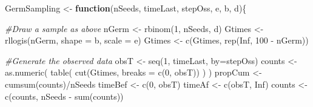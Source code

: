 \documentclass[
]{book}
\newenvironment{Shaded}{\begin{snugshade}}{\end{snugshade}}
\newcommand{\AttributeTok}[1]{\textcolor[rgb]{0.77,0.63,0.00}{#1}}
\newcommand{\CommentTok}[1]{\textcolor[rgb]{0.56,0.35,0.01}{\textit{#1}}}
\newcommand{\ConstantTok}[1]{\textcolor[rgb]{0.00,0.00,0.00}{#1}}
\newcommand{\ControlFlowTok}[1]{\textcolor[rgb]{0.13,0.29,0.53}{\textbf{#1}}}
\newcommand{\DecValTok}[1]{\textcolor[rgb]{0.00,0.00,0.81}{#1}}
\newcommand{\FunctionTok}[1]{\textcolor[rgb]{0.00,0.00,0.00}{#1}}
\newcommand{\NormalTok}[1]{#1}
\newcommand{\OtherTok}[1]{\textcolor[rgb]{0.56,0.35,0.01}{#1}}
\newcommand{\SpecialCharTok}[1]{\textcolor[rgb]{0.00,0.00,0.00}{#1}}
\begin{document}
\begin{Shaded}
\begin{Highlighting}[]
\NormalTok{GermSampling }\OtherTok{\textless{}{-}} \ControlFlowTok{function}\NormalTok{(nSeeds, timeLast, stepOss, e, b, d)\{}
    
    \CommentTok{\#Draw a sample as above}
\NormalTok{    nGerm }\OtherTok{\textless{}{-}} \FunctionTok{rbinom}\NormalTok{(}\DecValTok{1}\NormalTok{, nSeeds, d)}
\NormalTok{    Gtimes }\OtherTok{\textless{}{-}} \FunctionTok{rllogis}\NormalTok{(nGerm, }\AttributeTok{shape =}\NormalTok{ b, }\AttributeTok{scale =}\NormalTok{ e)}
\NormalTok{    Gtimes }\OtherTok{\textless{}{-}} \FunctionTok{c}\NormalTok{(Gtimes, }\FunctionTok{rep}\NormalTok{(}\ConstantTok{Inf}\NormalTok{, }\DecValTok{100} \SpecialCharTok{{-}}\NormalTok{ nGerm))}

    
    \CommentTok{\#Generate the observed data}
\NormalTok{    obsT }\OtherTok{\textless{}{-}} \FunctionTok{seq}\NormalTok{(}\DecValTok{1}\NormalTok{, timeLast, }\AttributeTok{by=}\NormalTok{stepOss) }
\NormalTok{    counts }\OtherTok{\textless{}{-}} \FunctionTok{as.numeric}\NormalTok{( }\FunctionTok{table}\NormalTok{( }\FunctionTok{cut}\NormalTok{(Gtimes, }\AttributeTok{breaks =} \FunctionTok{c}\NormalTok{(}\DecValTok{0}\NormalTok{, obsT)) ) )}
\NormalTok{    propCum }\OtherTok{\textless{}{-}} \FunctionTok{cumsum}\NormalTok{(counts)}\SpecialCharTok{/}\NormalTok{nSeeds}
\NormalTok{    timeBef }\OtherTok{\textless{}{-}} \FunctionTok{c}\NormalTok{(}\DecValTok{0}\NormalTok{, obsT)}
\NormalTok{    timeAf }\OtherTok{\textless{}{-}} \FunctionTok{c}\NormalTok{(obsT, }\ConstantTok{Inf}\NormalTok{)}
\NormalTok{    counts }\OtherTok{\textless{}{-}} \FunctionTok{c}\NormalTok{(counts, nSeeds }\SpecialCharTok{{-}} \FunctionTok{sum}\NormalTok{(counts))}
    

\end{Highlighting}
\end{Shaded}
\end{document}
